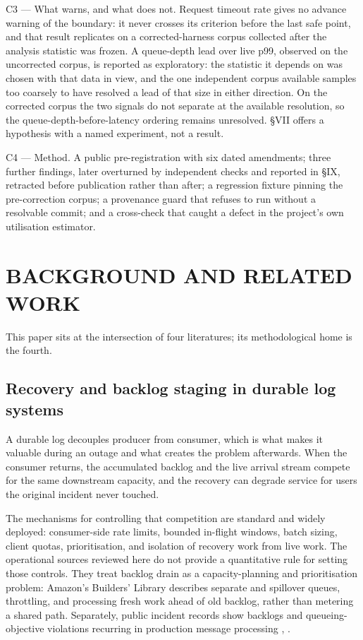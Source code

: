 \documentclass{ieeeaccess}
\begin{document}
C3 --- What warns, and what does not. Request timeout rate gives no advance warning of the boundary: it never crosses its criterion before the last safe point, and that result replicates on a corrected-harness corpus collected after the analysis statistic was frozen. A queue-depth lead over live p99, observed on the uncorrected corpus, is reported as exploratory: the statistic it depends on was chosen with that data in view, and the one independent corpus available samples too coarsely to have resolved a lead of that size in either direction. On the corrected corpus the two signals do not separate at the available resolution, so the queue-depth-before-latency ordering remains unresolved. \S{}VII offers a hypothesis with a named experiment, not a result.

C4 --- Method. A public pre-registration with six dated amendments; three further findings, later overturned by independent checks and reported in \S{}IX, retracted before publication rather than after; a regression fixture pinning the pre-correction corpus; a provenance guard that refuses to run without a resolvable commit; and a cross-check that caught a defect in the project's own utilisation estimator.

\section{BACKGROUND AND RELATED WORK}

This paper sits at the intersection of four literatures; its methodological home is the fourth.

\subsection{Recovery and backlog staging in durable log systems}

A durable log decouples producer from consumer, which is what makes it valuable during an outage and what creates the problem afterwards. When the consumer returns, the accumulated backlog and the live arrival stream compete for the same downstream capacity, and the recovery can degrade service for users the original incident never touched.

The mechanisms for controlling that competition are standard and widely deployed: consumer-side rate limits, bounded in-flight windows, batch sizing, client quotas, prioritisation, and isolation of recovery work from live work. The operational sources reviewed here do not provide a quantitative rule for setting those controls. They treat backlog drain as a capacity-planning and prioritisation problem: Amazon's Builders' Library \cite{yanacek} describes separate and spillover queues, throttling, and processing fresh work ahead of old backlog, rather than metering a shared path. Separately, public incident records show backlogs and queueing-objective violations recurring in production message processing \cite{gitlab-20797}, \cite{gitlab-21046}.
\end{document}
